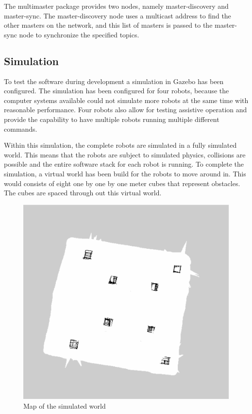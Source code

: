 \documentclass[10pt, journal]{IEEEtran}
\begin{document}
The multimaster package provides two nodes, namely master-discovery and master-sync. The master-discovery node uses a multicast address to find the other masters on the network, and this list of masters is passed to the master-sync node to synchronize the specified topics.
\subsection{Simulation}
To test the software during development a simulation in Gazebo has been configured\cite{MultipleRobots}. The simulation has been configured for four robots, because the computer systems available could not simulate more robots at the same time with reasonable performance. Four robots also allow for testing assistive operation and provide the capability to have multiple robots running multiple different commands.

Within this simulation, the complete robots are simulated in a fully simulated world. This means that the robots are subject to simulated physics, collisions are possible and the entire software stack for each robot is running. To complete the simulation, a virtual world has been build for the robots to move around in. This would consists of eight one by one by one meter cubes that represent obstacles. The cubes are spaced through out this virtual world.
\begin{figure}[htp]
\centering
\includegraphics[width=\columnwidth]{gazebo_2}
\caption{Map of the simulated world}
\label{SimulatedWorldMap}
\end{figure}
\end{document}
